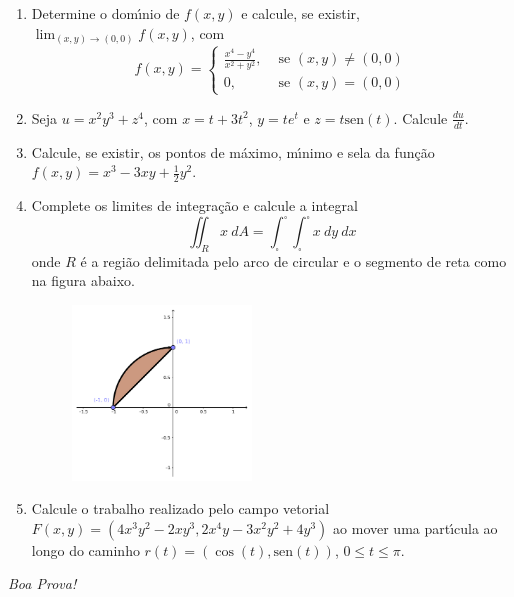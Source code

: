 \documentclass[a4paper,5pt]{amsbook}
\newcommand{\sen}{\text{sen}}
\newcommand{\ds}{\displaystyle}
\begin{document}
\vspace{0.2cm}
\begin{enumerate}
	\vspace{0.5cm}

	\item Determine o dom\'{\i}nio de $f(x,y)$ e calcule, se existir,
		$\ds{}\lim_{(x,y)\rightarrow(0,0)} f(x,y)$, com
		\begin{equation*}
		f(x,y) = \left\{
			\begin{array}{cl}
				\ds{}\frac{x^4-y^4}{x^2+y^2}, & \text{ se } (x,y)\neq(0,0) \\
				0, & \text{ se } (x,y) = (0,0)
			\end{array}\right.
		\end{equation*}
	\vspace{0.5cm}

	\item Seja $u = x^2y^3 + z^4$, com $x=t+3t^2$, $y=te^t$ e $z=t \sen(t)$.
		Calcule $\ds{}\frac{du}{dt}$.
	\vspace{0.5cm}

	\item Calcule, se existir, os pontos de m\'aximo, m\'{\i}nimo e sela da fun\c{c}\~ao
		$\ds{}f(x,y) = x^3 - 3xy + \frac{1}{2}y^2$.
	\vspace{0.5cm}

	\item Complete os limites de integra\c{c}\~ao e calcule a integral
		\begin{equation*}
			\iint_R x\ dA = \int_\square^\square \int_\square^\square x\ dy\ dx
		\end{equation*}
		onde $R$ \'e a regi\~ao delimitada pelo arco de circular e o segmento de
		reta como na figura abaixo.
		\begin{figure}[h]
			\centering{}
			\includegraphics[width=0.45\textwidth]{ex5.pdf}
		\end{figure}
	\vspace{0.5cm}

	\item
		Calcule o trabalho realizado pelo campo vetorial $F(x,y) =
		(4x^3y^2-2xy^3, 2x^4y-3x^2y^2+4y^3)$ ao mover uma part\'{\i}cula ao longo do caminho
		$r(t) = (\cos(t), \sen(t))$, $0\le t \le \pi$.

\end{enumerate}

\begin{flushright}
	\textit{Boa Prova!}
\end{flushright}
\end{document}
